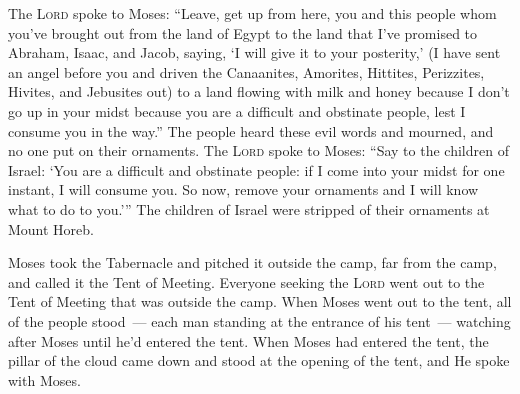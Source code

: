
\begin{inparaenum}
     The \textsc{Lord} spoke to Moses: ``Leave, get up from here, you and this people whom you've brought out from the land of Egypt to the land that I've promised to Abraham, Isaac, and Jacob, saying, `I will give it to your posterity,'%
     (I have sent an angel before you and driven the Canaanites, Amorites, Hittites, Perizzites, Hivites, and Jebusites out)%
     to a land flowing with milk and honey because I don't go up in your midst because you are a difficult and obstinate people, lest I consume you in the way.''%
     The people heard these evil words and mourned, and no one put on their ornaments.%
     The \textsc{Lord} spoke to Moses: ``Say to the children of Israel: `You are a difficult and obstinate people: if I come into your midst for one instant, I will consume you. So now, remove your ornaments and I will know what to do to you.'\thinspace''%
     The children of Israel were stripped of their ornaments at Mount Horeb.%
    
     Moses took the Tabernacle and pitched it outside the camp, far from the camp, and called it the Tent of Meeting. Everyone seeking the \textsc{Lord} went out to the Tent of Meeting that was outside the camp.%
     When Moses went out to the tent, all of the people stood~--- each man standing at the entrance of his tent~--- watching after Moses until he'd entered the tent.%
     When Moses had entered the tent, the pillar of the cloud came down and stood at the opening of the tent, and He spoke with Moses.%
    
    
\end{inparaenum}
